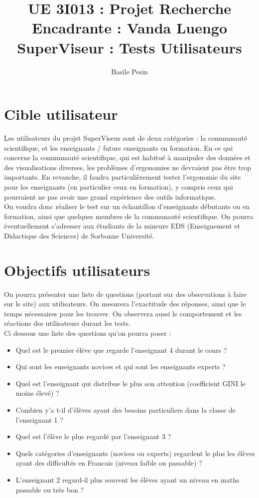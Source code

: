 \documentclass{article}
\title{UE 3I013 : Projet Recherche\\
    Encadrante : Vanda Luengo\\
    SuperViseur : Tests Utilisateurs}
\author{Basile Pesin}
\begin{document}
\maketitle
\newpage

\section{Cible utilisateur}
Les utilisateurs du projet SuperViseur sont de deux catégories : la communauté scientifique, et les enseignants / futurs enseignants en formation. En ce qui concerne la communauté scientifique, qui est habitué à manipuler des données et des visualisations diverses, les problèmes d'ergonomies ne devraient pas être trop importants. En revanche, il faudra particulièrement tester l'ergonomie du site pour les enseignants (en particulier ceux en formation), y compris ceux qui pourraient ne pas avoir une grand expérience des outils informatique.\\
On voudra donc réaliser le test sur un échantillon d'enseignants débutants ou en formation, ainsi que quelques membres de la communauté scientifique. On pourra éventuellement s'adresser aux étudiants de la mineure EDS (Enseignement et Didactique des Sciences) de Sorbonne Université.

\section{Objectifs utilisateurs}
On pourra présenter une liste de questions (portant sur des observations à faire sur le site) aux utilisateurs. On mesurera l'exactitude des réponses, ainsi que le temps nécessaires pour les trouver. On observera aussi le comportement et les réactions des utilisateurs durant les tests.\\
Ci dessous une liste des questions qu'on pourra poser :
\begin{itemize}
    \item Quel est le premier élève que regarde l'enseignant 4 durant le cours ?
    \item Qui sont les enseignants novices et qui sont les enseignants experts ?
    \item Quel est l'enseignant qui distribue le plus son attention (coefficient GINI le moins élevé) ?
    \item Combien y'a t-il d'élèves ayant des besoins particuliers dans la classe de l'enseignant 1 ?
    \item Quel est l'élève le plus regardé par l'enseignant 3 ? 
    \item Quels catégories d'enseignants (novices ou experts) regardent le plus les élèves ayant des difficultés en Francais (niveau faible ou passable) ?
    \item L'enseignant 2 regard-il plus souvent les élèves ayant un niveau en maths passable ou très bon ?
\end{itemize}
\end{document}
